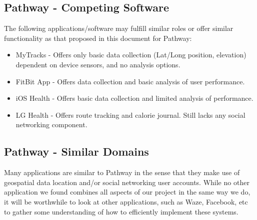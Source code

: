 \documentclass{article}
\begin{document}
\subsection{Pathway - Competing Software}
The following applications/software may fulfill similar roles or offer similar functionality as that proposed in this document for Pathway:
\begin{itemize}
    \item MyTracks - Offers only basic data collection (Lat/Long position, elevation) dependent on device sensors, and no analysis options.
    \item FitBit App - Offers data collection and basic analysis of user performance.
    \item iOS Health - Offers basic data collection and limited analysis of performance.
    \item LG Health - Offers route tracking and calorie journal. Still lacks any social networking component.
\end{itemize}

\subsection{Pathway - Similar Domains}
Many applications are similar to Pathway in the sense that they make use of geospatial data location and/or social networking user accounts. While no other application we found combines all aspects of our project in the same way we do, it will be worthwhile to look at other applications, such as Waze, Facebook, etc to gather some understanding of how to efficiently implement these systems.
\end{document}
